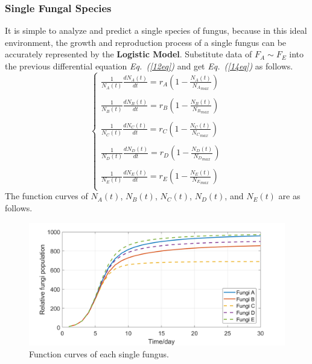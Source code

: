\subsubsection{Single Fungal Species}
It is simple to analyze and predict a single species of fungus, because in this ideal environment, the growth and reproduction process of a single fungus can be accurately represented by the \textbf{Logistic Model}. Substitute data of $F_A\sim F_E$ into the previous differential equation \textit{Eq.~(\ref{12eq})} and get \textit{Eq.~(\ref{14eq})} as follows.
\begin{equation}
  \label{14eq}
  \begin{cases}
    \frac{1}{N_A(t)}\frac{dN_A(t)}{dt} = r_A(1-\frac{N_A(t)}{{N_A}_{max}}) \\ \\
    \frac{1}{N_B(t)}\frac{dN_B(t)}{dt} = r_B(1-\frac{N_B(t)}{{N_B}_{max}}) \\ \\
    \frac{1}{N_C(t)}\frac{dN_C(t)}{dt} = r_C(1-\frac{N_C(t)}{{N_C}_{max}}) \\ \\
    \frac{1}{N_D(t)}\frac{dN_D(t)}{dt} = r_D(1-\frac{N_D(t)}{{N_D}_{max}}) \\ \\
    \frac{1}{N_E(t)}\frac{dN_E(t)}{dt} = r_E(1-\frac{N_E(t)}{{N_E}_{max}}) \\
  \end{cases}
\end{equation}
The function curves of $N_A(t)$, $N_B(t)$, $N_C(t)$, $N_D(t)$, and $N_E(t)$ are as follows.
\par
\begin{figure}[H]
  \centering
  \label{functioncurves}
  \includegraphics[width=\textwidth]{figures/Single.png}
  \caption{Function curves of each single fungus.}
\end{figure}
\par
